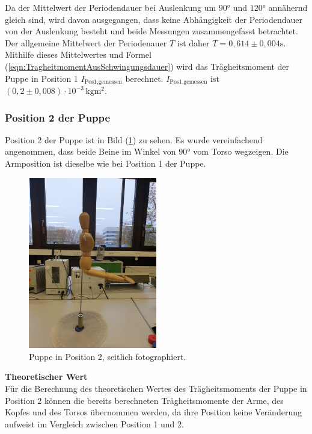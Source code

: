       Da der Mittelwert der Periodendauer bei Auslenkung um $90$° und $120$° annähernd gleich sind, wird davon ausgegangen, dass keine Abhängigkeit der 
      Periodendauer von der Auslenkung besteht und beide Messungen zusammengefasst betrachtet. 
      Der allgemeine Mittelwert der Periodenauer $T$ ist daher $T = 0,614 \pm 0,004 \unit{\second}$. 
      Mithilfe dieses Mittelwertes und Formel (\ref{eqn:TragheitmomentAusSchwingungsdauer}) wird das 
      Trägheitsmoment der Puppe in Position 1 $I_{\text{Pos1,gemessen}}$ berechnet. 
      $I_{\text{Pos1,gemessen}}$ ist $(0,2 \pm 0,008) \cdot 10^{-3}\, \unit{\kilo\gram\meter\squared}$.
            
    \subsubsection{Position 2 der Puppe}
    Position 2 der Puppe ist in Bild (\ref{fig:Position_2}) zu sehen. 
    Es wurde vereinfachend angenommen, dass beide Beine im Winkel von $90$° vom Torso wegzeigen. Die Armposition ist dieselbe wie bei Position 1 der Puppe.
    \begin{figure}[H]
      \centering
      \includegraphics[width=0.5\textwidth]{Position_2.jpg}
      \caption{Puppe in Position 2, seitlich fotographiert.}
      \label{fig:Position_2}
    \end{figure}
      \textbf{Theoretischer Wert} \\
      Für die Berechnung des theoretischen Wertes des Trägheitsmoments der Puppe in Position 2 können die bereits berechneten Trägheitsmomente der
      Arme, des Kopfes und des Torsos übernommen werden, da ihre Position keine Veränderung aufweist im Vergleich zwischen Position 1 und 2. 
